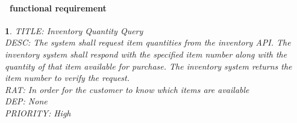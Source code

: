 \documentclass{scrreprt}
\theoremstyle{funreq}
\newtheorem{funreq}{}
\newcommand*{\reqref}[1]{\hyperref[#1]{FR\ref*{#1}}}
\begin{document}
	\paragraph[]{\Subsectionname ~functional requirement }
	\begin{funreq}
		\label{inventory_quantity}
		TITLE: Inventory Quantity Query\\
		DESC: The system shall request item quantities from the inventory API.  The inventory system shall respond with the specified item number along with the quantity of that item available for purchase. The inventory system returns the item number to verify the request.\\
		RAT: In order for the customer to know which items are available\\
		DEP: None\\
		PRIORITY: High\\
	\end{funreq}
	
	
\end{document}
